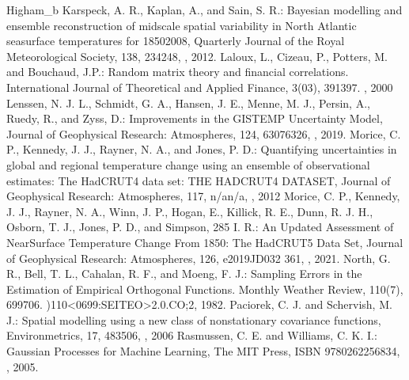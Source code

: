 \documentclass[letterpaper,10pt,english]{sphinxmanual}
\begin{document}
\begin{sphinxthebibliography}{Higham\_b}
Karspeck, A. R., Kaplan, A., and Sain, S. R.: Bayesian modelling and ensemble reconstruction of mid\sphinxhyphen{}scale spatial variability in North Atlantic sea\sphinxhyphen{}surface temperatures for 1850\sphinxhyphen{}2008, Quarterly Journal of the Royal Meteorological Society, 138, 234\textendash{}248, , 2012.
\sphinxAtStartPar
Laloux, L., Cizeau, P., Potters, M. and Bouchaud, J.P.: Random matrix theory and financial correlations. International Journal of Theoretical and Applied Finance, 3(03), 391\sphinxhyphen{}397. , 2000
\sphinxAtStartPar
Lenssen, N. J. L., Schmidt, G. A., Hansen, J. E., Menne, M. J., Persin, A., Ruedy, R., and Zyss, D.: Improvements in the GISTEMP Uncertainty Model, Journal of Geophysical Research: Atmospheres, 124, 6307\textendash{}6326, , 2019.
\sphinxAtStartPar
Morice, C. P., Kennedy, J. J., Rayner, N. A., and Jones, P. D.: Quantifying uncertainties in global and regional temperature change using an ensemble of observational estimates: The HadCRUT4 data set: THE HADCRUT4 DATASET, Journal of Geophysical Research: Atmospheres, 117, n/a\textendash{}n/a, , 2012
\sphinxAtStartPar
Morice, C. P., Kennedy, J. J., Rayner, N. A., Winn, J. P., Hogan, E., Killick, R. E., Dunn, R. J. H., Osborn, T. J., Jones, P. D., and Simpson, 285 I. R.: An Updated Assessment of Near\sphinxhyphen{}Surface Temperature Change From 1850: The HadCRUT5 Data Set, Journal of Geophysical Research: Atmospheres, 126, e2019JD032 361, , 2021.
\sphinxAtStartPar
North, G. R., Bell, T. L., Cahalan, R. F., and Moeng, F. J.: Sampling Errors in the Estimation of Empirical Orthogonal Functions. Monthly Weather Review, 110(7), 699\textendash{}706. )110\textless{}0699:SEITEO\textgreater{}2.0.CO;2, 1982.
\sphinxAtStartPar
Paciorek, C. J. and Schervish, M. J.: Spatial modelling using a new class of nonstationary covariance functions, Environmetrics, 17, 483\textendash{}506, , 2006
\sphinxAtStartPar
Rasmussen, C. E. and Williams, C. K. I.: Gaussian Processes for Machine Learning, The MIT Press, ISBN 978\sphinxhyphen{}0\sphinxhyphen{}262\sphinxhyphen{}25683\sphinxhyphen{}4, , 2005.

\end{sphinxthebibliography}
\end{document}

